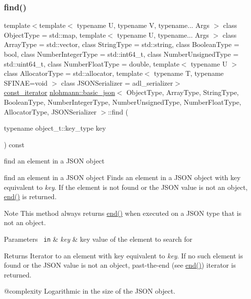 \subsubsection{\texorpdfstring{find()}{find()}\hspace{0.1cm}{\footnotesize\ttfamily [2/2]}}
{\footnotesize\ttfamily template$<$template$<$ typename U, typename V, typename... Args $>$ class Object\+Type = std\+::map, template$<$ typename U, typename... Args $>$ class Array\+Type = std\+::vector, class String\+Type  = std\+::string, class Boolean\+Type  = bool, class Number\+Integer\+Type  = std\+::int64\+\_\+t, class Number\+Unsigned\+Type  = std\+::uint64\+\_\+t, class Number\+Float\+Type  = double, template$<$ typename U $>$ class Allocator\+Type = std\+::allocator, template$<$ typename T, typename S\+F\+I\+N\+A\+E=void $>$ class J\+S\+O\+N\+Serializer = adl\+\_\+serializer$>$ \\
\mbox{\hyperlink{classnlohmann_1_1basic__json_a41a70cf9993951836d129bb1c2b3126a}{const\+\_\+iterator}} \mbox{\hyperlink{classnlohmann_1_1basic__json}{nlohmann\+::basic\+\_\+json}}$<$ Object\+Type, Array\+Type, String\+Type, Boolean\+Type, Number\+Integer\+Type, Number\+Unsigned\+Type, Number\+Float\+Type, Allocator\+Type, J\+S\+O\+N\+Serializer $>$\+::find (\begin{DoxyParamCaption}\item[{typename object\+\_\+t\+::key\+\_\+type}]{key }\end{DoxyParamCaption}) const\hspace{0.3cm}{\ttfamily [inline]}}



find an element in a J\+S\+ON object 

find an element in a J\+S\+ON object Finds an element in a J\+S\+ON object with key equivalent to {\itshape key}. If the element is not found or the J\+S\+ON value is not an object, \mbox{\hyperlink{classnlohmann_1_1basic__json_a13e032a02a7fd8a93fdddc2fcbc4763c}{end()}} is returned.

\begin{DoxyNote}{Note}
This method always returns \mbox{\hyperlink{classnlohmann_1_1basic__json_a13e032a02a7fd8a93fdddc2fcbc4763c}{end()}} when executed on a J\+S\+ON type that is not an object.
\end{DoxyNote}

\begin{DoxyParams}[1]{Parameters}
\mbox{\texttt{ in}}  & {\em key} & key value of the element to search for\\
\hline
\end{DoxyParams}
\begin{DoxyReturn}{Returns}
Iterator to an element with key equivalent to {\itshape key}. If no such element is found or the J\+S\+ON value is not an object, past-\/the-\/end (see \mbox{\hyperlink{classnlohmann_1_1basic__json_a13e032a02a7fd8a93fdddc2fcbc4763c}{end()}}) iterator is returned.
\end{DoxyReturn}
@complexity Logarithmic in the size of the J\+S\+ON object.

